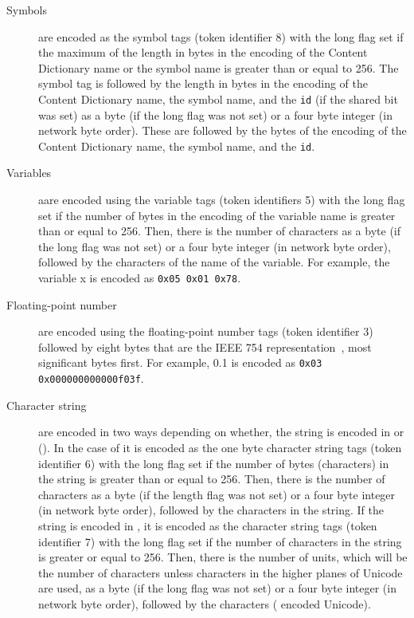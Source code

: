 \begin{description}
\item[Symbols] are encoded as the symbol tags (token identifier 8) with the long flag set
  if the maximum of the length in bytes in the  encoding of the Content
  Dictionary name or the symbol name is greater than or equal to 256. The symbol tag is
  followed by the length in bytes in the  encoding of the Content
  Dictionary name, the symbol name, and the \lstinline|id| (if the shared bit was set) as
  a byte (if the long flag was not set) or a four byte integer (in network byte
  order). These are followed by the bytes of the  encoding of the Content
  Dictionary name, the symbol name, and the \lstinline|id|.
\item[Variables] aare encoded using the variable tags (token identifiers 5) with the long
  flag set if the number of bytes in the  encoding of the variable name is
  greater than or equal to 256.  Then, there is the number of characters as a byte (if the
  long flag was not set) or a four byte integer (in network byte order), followed by the
  characters of the name of the variable. For example, the variable x is encoded as
  \lstinline|0x05 0x01 0x78|.
  \item[Floating-point number] are encoded using the floating-point number tags (token
    identifier 3) followed by eight bytes that are the IEEE 754
    representation~\cite{ieee754_85}, most significant bytes first. For example, 0.1 is
    encoded as \lstinline|0x03 0x000000000000f03f|.
  \item[Character string] are encoded in two ways depending on whether, the string is
    encoded in  or  ().  In the case
    of  it is encoded as the one byte character string tags (token
    identifier 6) with the long flag set if the number of bytes (characters) in the string
    is greater than or equal to 256.  Then, there is the number of characters as a byte
    (if the length flag was not set) or a four byte integer (in network byte order),
    followed by the characters in the string. If the string is encoded in
    , it is encoded as the  character string tags (token
    identifier 7) with the long flag set if the number of characters in the string is
    greater or equal to 256. Then, there is the number of  units, which
    will be the number of characters unless characters in the higher planes of Unicode are
    used, as a byte (if the long flag was not set) or a four byte integer (in network byte
    order), followed by the characters ( encoded Unicode).


\end{description}
